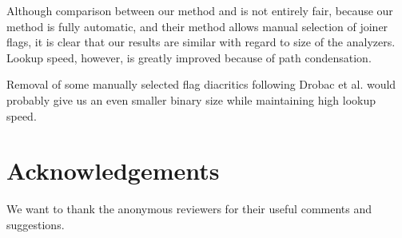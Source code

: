 \documentclass[11pt]{article}
\begin{document}
Although comparison between our method and \cite{drobac2014} is not
entirely fair, because our method is fully automatic, and their method
allows manual selection of joiner flags, it is clear that our results
are similar with regard to size of the analyzers. Lookup speed, however,
is greatly improved because of path condensation.

Removal of some manually selected flag diacritics following Drobac et
al.  would probably give us an even smaller binary
size while maintaining high lookup speed.

\section{Acknowledgements}
We want to thank the anonymous reviewers for their useful comments and suggestions.



\end{document}
